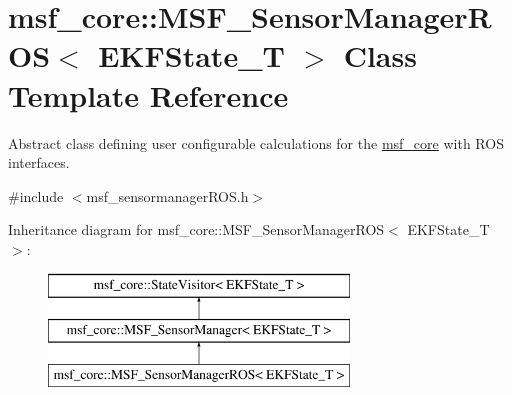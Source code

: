 \hypertarget{structmsf__core_1_1MSF__SensorManagerROS}{\section{msf\-\_\-core\-:\-:M\-S\-F\-\_\-\-Sensor\-Manager\-R\-O\-S$<$ E\-K\-F\-State\-\_\-\-T $>$ Class Template Reference}
\label{structmsf__core_1_1MSF__SensorManagerROS}
}


Abstract class defining user configurable calculations for the \hyperlink{namespacemsf__core}{msf\-\_\-core} with R\-O\-S interfaces.  




{\ttfamily \#include $<$msf\-\_\-sensormanager\-R\-O\-S.\-h$>$}

Inheritance diagram for msf\-\_\-core\-:\-:M\-S\-F\-\_\-\-Sensor\-Manager\-R\-O\-S$<$ E\-K\-F\-State\-\_\-\-T $>$\-:\begin{figure}[H]
\begin{center}
\leavevmode
\includegraphics[height=3.000000cm]{structmsf__core_1_1MSF__SensorManagerROS}
\end{center}
\end{figure}
